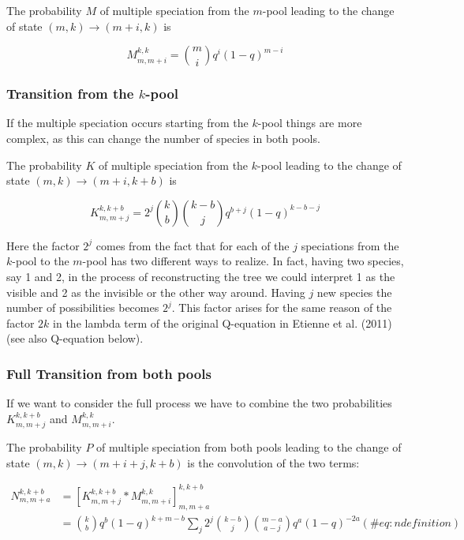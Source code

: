 \documentclass[]{article}
\begin{document}
The probability \(M\) of multiple speciation from the \(m\)-pool leading to the change
of state \((m,k) \rightarrow (m + i, k)\) is

\[
M^{k,k}_{m,m + i} = \binom{m}{i} q ^ i (1 - q) ^ {m - i}
\]

\hypertarget{transition-from-the-k-pool}{%
\subsubsection{\texorpdfstring{Transition from the \(k\)-pool}{Transition from the k-pool}}\label{transition-from-the-k-pool}}

If the multiple speciation occurs starting from the \(k\)-pool things are more complex,
as this can change the number of species in both pools.

The probability \(K\) of multiple speciation from the \(k\)-pool leading to the change
of state \((m,k) \rightarrow (m + i, k + b)\) is

\[
K^{k, k + b}_{m, m + j} = 2 ^ j \binom{k}{b} \binom{k - b}{j} q ^ {b + j} (1 - q) ^ {k - b - j}
\]

Here the factor \(2 ^ j\) comes from the fact that for each of the \(j\) speciations
from the \(k\)-pool to the \(m\)-pool has two different ways to realize. In fact,
having two species, say 1 and 2, in the process of reconstructing
the tree we could interpret 1 as the visible and 2 as the invisible or the other
way around. Having \(j\) new species the number of possibilities becomes \(2 ^ j\).
This factor arises for the same reason of the factor \(2k\) in the lambda term
of the original Q-equation in Etienne et al. (2011) (see also Q-equation below).

\hypertarget{full-transition-from-both-pools}{%
\subsubsection{Full Transition from both pools}\label{full-transition-from-both-pools}}

If we want to consider the full process we have to combine the two probabilities
\(K^{k, k + b}_{m, m + j}\) and \(M^{k,k}_{m, m + i}\).

The probability \(P\) of multiple speciation from both pools leading to the change
of state \((m,k) \rightarrow (m + i + j, k + b)\) is the convolution of the two
terms:

\[
\begin{aligned}
N^{k, k + b}_{m, m + a} & = [K^{k, k + b}_{m, m + j} * M^{k,k}_{m, m + i}]^{k, k + b}_{m, m + a} \\
& = \binom{k}{b} q ^ b (1 - q) ^ {k + m - b}
\sum_j 2 ^ j \binom{k - b}{j} \binom{m - a} {a - j} q^a (1 - q) ^{-2a}
(\#eq:ndefinition)
\end{aligned}
\]
\end{document}

